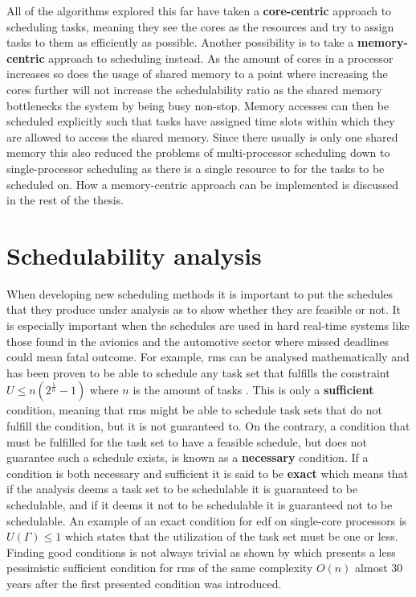 \documentclass{kththesis}
\begin{document}
All of the algorithms explored this far have taken a \textbf{core-centric} approach to scheduling tasks,
meaning they see the cores as the resources and try to assign tasks to them as efficiently as
possible. Another possibility is to take a \textbf{memory-centric} approach to scheduling instead.
As the amount of cores in a processor increases so does the usage of shared memory to a point where
increasing the cores further will not increase the schedulability ratio as the shared memory
bottlenecks the system by being busy non-stop. Memory accesses can then be scheduled explicitly such
that tasks have assigned time slots within which they are allowed to access the shared memory. Since
there usually is only one shared memory this also reduced the problems of multi-processor scheduling
down to  single-processor scheduling as there is a single resource to for the tasks to be scheduled
on. How a memory-centric approach can be implemented is discussed in the rest of the thesis.

\section{Schedulability analysis} \label{sec:schedulability_analysis}

When developing new scheduling methods it is important to put the schedules that they produce under
analysis as to show whether they are feasible or not. It is especially important when the schedules
are used in hard real-time systems like those found in the avionics and the automotive sector where
missed deadlines could mean fatal outcome. For example, \acrshort{rms} can be analysed
mathematically and has been proven to be able to schedule any task set that fulfills the constraint
$ U \le n(2^{\frac{1}{n}}-1) $ where $ n $ is the amount of tasks \parencite{liu_scheduling_1973}.
This is only a \textbf{sufficient} condition, meaning that \acrshort{rms} might be able to schedule
task sets that do not fulfill the condition, but it is not guaranteed to. On the contrary, a
condition that must be fulfilled for the task set to have a feasible schedule, but does not
guarantee such a schedule exists, is known as a \textbf{necessary} condition. If a condition is both
necessary and sufficient it is said to be \textbf{exact} which means that if the analysis deems a
task set to be schedulable it is guaranteed to be schedulable, and if it deems it not to be
schedulable it is guaranteed not to be schedulable. An example of an exact condition for
\acrshort{edf} on single-core processors is $ U(\Gamma) \leq 1 $ which states that the utilization
of the task set must be one or less. Finding good conditions is not always trivial as shown by
\parencite{bini_hyperbolic_2001} which presents a less pessimistic sufficient condition for
\acrshort{rms} of the same complexity $ O(n) $ almost 30 years after the first presented condition
was introduced. 
\end{document}
